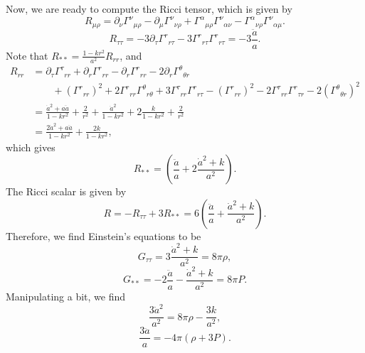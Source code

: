 \begin{solution}
    Now, we are ready to compute the Ricci tensor, which is given by
    \begin{equation}
        R_{\mu\rho} = \partial_\nu \Gamma^\nu{}_{\mu\rho} - \partial_\mu \Gamma^\nu {}_{\nu\rho} + \Gamma^\alpha{}_{\mu\rho}\Gamma^\nu{}_{\alpha\nu} - \Gamma^\alpha{}_{\nu\rho}\Gamma^\nu{}_{\alpha\mu}.
    \end{equation}
    \begin{equation}
        R_{\tau\tau} = -3\partial_\tau\Gamma^{r}{}_{r\tau} - 3\Gamma^r{}_{r\tau}\Gamma^r{}_{r\tau} = -3\frac{\ddot a}{a}.
    \end{equation}
    Note that $R_{**} = \frac{1-kr^2}{a^2}R_{rr}$, and
    \begin{equation}
        \begin{aligned}
            R_{rr} &= \partial_\tau\Gamma^\tau{}_{rr} +\partial_r\Gamma^r{}_{rr} -\partial_r\Gamma^r{}_{rr} - 2\partial_r\Gamma^\theta{}_{\theta r}\\
            &\qquad+ (\Gamma^r{}_{rr})^2 + 2\Gamma^r{}_{rr}\Gamma^\theta{}_{r\theta}+3\Gamma^\tau{}_{rr}\Gamma^r{}_{r\tau}- (\Gamma^r{}_{rr})^2 - 2\Gamma^\tau{}_{rr}\Gamma^r{}_{\tau r} - 2(\Gamma^\theta{}_{\theta r})^2\\
            &=\frac{\dot a^2 + a \ddot a}{1-kr^2} + \frac{2}{r^2} +\frac{\dot a^2}{1-kr^2} +2\frac{k}{1-kr^2}+ \frac{2}{r^2}\\&= \frac{2\dot a^2 + a \ddot a}{1-kr^2} + \frac{2k}{1-kr^2},
        \end{aligned}
    \end{equation}
    which gives
    \begin{equation}
        R_{**} = \left(\frac{\ddot a}{a} + 2\frac{\dot a^2+k}{a^2}\right).
    \end{equation}
    The Ricci scalar is given by
    \begin{equation}
        R = -R_{\tau\tau} + 3R_{**} = 6\left(\frac{\ddot a}{a} + \frac{\dot a^2+k}{a^2}\right).
    \end{equation}
    Therefore, we find Einstein's equations to be
    \begin{equation}
        G_{\tau\tau} = 3\frac{\dot a^2+k}{a^2} = 8\pi \rho,
    \end{equation}
    \begin{equation}
        G_{**} = -2\frac{\ddot a}{a} - \frac{\dot a^2+k}{a^2} = 8\pi P.
    \end{equation}
    Manipulating a bit, we find
    \begin{equation}
        \frac{3\dot a ^2}{a^2} = 8\pi \rho - \frac{3k}{a^2},
    \end{equation}
    \begin{equation}
        \frac{3\ddot a}{a} = -4\pi(\rho+3P).
    \end{equation}
\end{solution}

